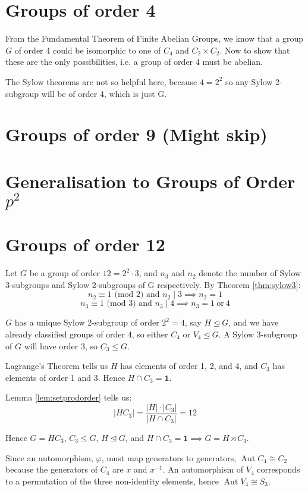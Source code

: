 \documentclass[a4paper, oneside, 12pt, final]{article}
\theoremstyle{definition}
\DeclareMathOperator{\Aut}{Aut}
\begin{document}
\section{Groups of order 4}
From the Fundamental Theorem of Finite Abelian Groups, we know that a group
\(G\) of order 4 could be isomorphic to one of \(C_4\) and \(C_2 \times C_2\).
Now to show that these are the only possibilities, i.e. a group of order 4 must
be abelian.

The Sylow theorems are not so helpful here, because \(4=2^2\) so any Sylow
2-subgroup will be of order 4, which is just G.

\section{Groups of order 9 (Might skip)}

\section{Generalisation to Groups of Order \(p^2\)}

\section{Groups of order 12}
Let \(G\) be a group of order \(12 = 2^2 \cdot 3\), and \(n_3\) and \(n_2\) denote the number of
Sylow 3-subgroups and Sylow 2-subgroups of G respectively.
By Theorem \ref{thm:sylow3}:
\[n_2 \equiv 1 \text{ (mod 2) and } n_2 \mid 3 \implies n_2 = 1\]
\[n_3 \equiv 1 \text{ (mod 3) and } n_3 \mid 4 \implies n_3 = 1 \ \text{or} \ 4\]

\(G\) has a unique Sylow 2-subgroup of order \(2^2 = 4\), say \(H \unlhd G\),
and we have already classified groups of order 4, so either \(C_4\) or \(V_4
\unlhd G\).
A Sylow 3-subgroup of \(G\) will have order 3, so  \(C_3 \leqslant G\).

Lagrange's Theorem tells us \(H\) has elements of order 1, 2, and 4, and \(C_3\) has elements of order 1 and 3.
Hence \(H \cap C_3 = \bm{1}\).

Lemma \ref{lem:setprodorder} tells us:
\[|H C_3| = \frac{|H| \cdot |C_3|}{|H \cap C_3|} = 12\]

Hence \(G = H C_3\), \(C_3 \leqslant G\), \(H \unlhd G\), and \(H \cap C_3 =
\bm{1} \implies G = H \rtimes C_3\).

Since an automorphism, \(\varphi\), must map generators to generators,
\(\Aut{C_4} \cong C_2\) because the generators of \(C_4\) are \(x\) and
\(x^{-1}\).
An automorphism of \(V_4\) corresponds to a permutation of the three
non-identity elements, hence \(\Aut{V_4} \cong S_3\).
\end{document}
